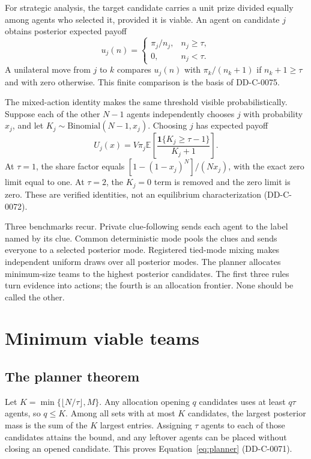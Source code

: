 \documentclass[11pt]{article}
\newcommand{\E}{\mathbb{E}}
\begin{document}
For strategic analysis, the target candidate carries a unit prize divided
equally among agents who selected it, provided it is viable. An agent on
candidate $j$ obtains posterior expected payoff
\begin{equation}
 u_j(n)=
 \begin{cases}
   \pi_j/n_j,& n_j\geq\tau,\\
   0,& n_j<\tau.
 \end{cases}
 \label{eq:payoff}
\end{equation}
A unilateral move from $j$ to $k$ compares $u_j(n)$ with
$\pi_k/(n_k+1)$ if $n_k+1\geq\tau$ and with zero otherwise. This finite
comparison is the basis of DD-C-0075.

The mixed-action identity makes the same threshold visible probabilistically.
Suppose each of the other $N-1$ agents independently chooses $j$ with
probability $x_j$, and let $K_j\sim\mathrm{Binomial}(N-1,x_j)$. Choosing $j$
has expected payoff
\begin{equation}
 U_j(x)=V\pi_j\E\left[
 \frac{\mathbf 1\{K_j\geq\tau-1\}}{K_j+1}
 \right].
 \label{eq:mixed-payoff}
\end{equation}
At $\tau=1$, the share factor equals
$[1-(1-x_j)^N]/(Nx_j)$, with the exact zero limit equal to one. At $\tau=2$,
the $K_j=0$ term is removed and the zero limit is zero. These are verified
identities, not an equilibrium characterization (DD-C-0072).

Three benchmarks recur. Private clue-following sends each agent to the label
named by its clue. Common deterministic mode pools the clues and sends everyone
to a selected posterior mode. Registered tied-mode mixing makes independent
uniform draws over all posterior modes. The planner allocates minimum-size
teams to the highest posterior candidates. The first three rules turn evidence
into actions; the fourth is an allocation frontier. None should be called the
other.

\section{Minimum viable teams}

\subsection{The planner theorem}

Let $K=\min\{\lfloor N/\tau\rfloor,M\}$. Any allocation opening $q$ candidates
uses at least $q\tau$ agents, so $q\leq K$. Among all sets with at most $K$
candidates, the largest posterior mass is the sum of the $K$ largest entries.
Assigning $\tau$ agents to each of those candidates attains the bound, and any
leftover agents can be placed without closing an opened candidate. This proves
Equation~\ref{eq:planner} (DD-C-0071).
\end{document}
